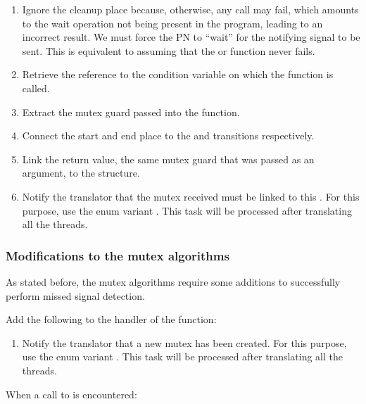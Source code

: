 \begin{enumerate}
      \item Ignore the cleanup place because, otherwise, any call may fail,
            which amounts to the wait operation not being present in the program,
            leading to an incorrect result.
            We must force the \acrshort{PN}
            to ``wait'' for the notifying signal to be sent.
            This is equivalent to assuming that the 
            or  function never fails.
      \item Retrieve the  reference to the condition variable
            on which the function is called.
      \item Extract the mutex guard passed into the function.
      \item Connect the start and end place to the
             and  transitions respectively.
      \item Link the return value, the same mutex guard that was passed as an argument,
            to the  structure.
      \item Notify the translator that the mutex received must be linked to this .
            For this purpose, use the enum variant .
            This task will be processed after translating all the threads.
\end{enumerate}

\subsubsection{Modifications to the mutex algorithms}

As stated before, the mutex algorithms require some additions to successfully
perform missed signal detection.

Add the following to the handler of the  function:

\begin{enumerate}
      \item Notify the translator that a new mutex has been created.
            For this purpose, use the enum variant .
            This task will be processed after translating all the threads.
\end{enumerate}

When a call to  is encountered:

